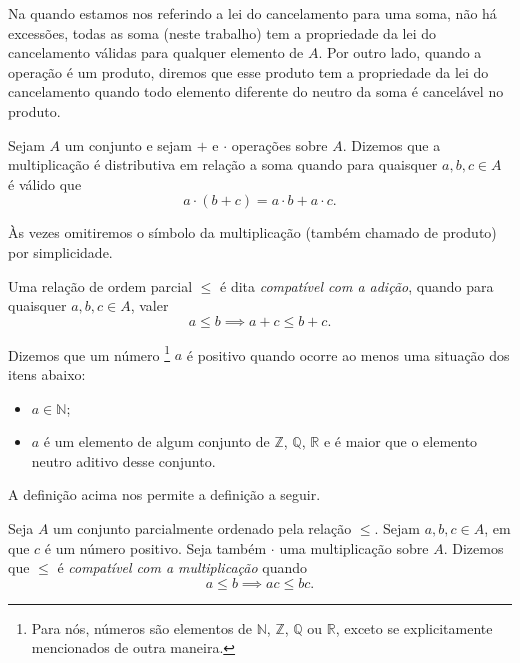 \documentclass[../main.tex]{subfiles}
\begin{document}
\begin{obs}
    Na  quando estamos nos referindo a lei do cancelamento para uma soma, não há excessões, todas as soma (neste trabalho) tem a propriedade da lei do cancelamento válidas para qualquer elemento de $A$. Por outro lado, quando a operação é um produto, diremos que esse produto tem a propriedade da lei do cancelamento quando todo elemento diferente do neutro da soma é cancelável no produto.
\end{obs}

\begin{defi}
    Sejam $A$ um conjunto e sejam $+$ e $\cdot$ operações sobre $A$. Dizemos que a multiplicação é distributiva em relação a soma quando para quaisquer $a, b, c \in A$ é válido que \[ a \cdot (b + c) = a \cdot b + a\cdot c. \]
\end{defi}
Às vezes omitiremos o símbolo da multiplicação (também chamado de produto) por simplicidade.
\begin{defi}
    Uma relação de ordem parcial $\leq$ é dita \emph{compatível com a adição}, quando para quaisquer $a,b,c \in A$, 
    valer \[ a \leq b \implies a + c \leq b + c. \]
\end{defi}

\begin{defi}\label{agb-def-numPositivo}
    Dizemos que um número \footnote{Para nós, números são elementos de $\mathbb{N}$, $\mathbb{Z}$, $\mathbb{Q}$ ou $\mathbb{R}$, exceto se explicitamente mencionados de outra maneira.} $a$ é positivo quando ocorre ao menos uma situação dos itens abaixo:
    \begin{itemize}
        \item $a \in \mathbb{N}$;
        \item $a$ é um elemento de algum conjunto de $\mathbb{Z}$, $\mathbb{Q}$, $\mathbb{R}$ e é maior que o elemento neutro aditivo desse conjunto.
    \end{itemize}
\end{defi}

A definição acima nos permite a definição a seguir.
\begin{defi}\label{agb-def-compativelMultiplicacao}
    Seja $A$ um conjunto parcialmente ordenado pela relação $\leq$. Sejam $a,b,c \in A$, em que $c$ é um número positivo. Seja também $\cdot$ uma multiplicação sobre $A$.
    Dizemos que $\leq$ é \emph{compatível com a multiplicação} quando 
    \[ a \leq b \implies ac \leq bc. \]
\end{defi}
\end{document}
